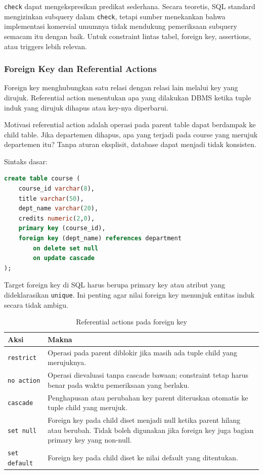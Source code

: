 \texttt{check} dapat mengekspresikan predikat sederhana. Secara teoretis, SQL standard mengizinkan subquery dalam \texttt{check}, tetapi sumber menekankan bahwa implementasi komersial umumnya tidak mendukung pemeriksaan subquery semacam itu dengan baik. Untuk constraint lintas tabel, foreign key, assertions, atau triggers lebih relevan.

\subsubsection{Foreign Key dan Referential Actions}

\begin{jawab}
Foreign key menghubungkan satu relasi dengan relasi lain melalui key yang dirujuk. Referential action menentukan apa yang dilakukan DBMS ketika tuple induk yang dirujuk dihapus atau key-nya diperbarui.
\end{jawab}

Motivasi referential action adalah operasi pada parent table dapat berdampak ke child table. Jika departemen dihapus, apa yang terjadi pada course yang merujuk departemen itu? Tanpa aturan eksplisit, database dapat menjadi tidak konsisten.

Sintaks dasar:
\begin{lstlisting}[language=SQL, caption={Contoh foreign key dengan referential action}, label={lst:foreign-key-action}]
create table course (
    course_id varchar(8),
    title varchar(50),
    dept_name varchar(20),
    credits numeric(2,0),
    primary key (course_id),
    foreign key (dept_name) references department
        on delete set null
        on update cascade
);
\end{lstlisting}

Target foreign key di SQL harus berupa primary key atau atribut yang dideklarasikan \texttt{unique}. Ini penting agar nilai foreign key menunjuk entitas induk secara tidak ambigu.

\begin{table}[H]
\centering
\begin{tabularx}{\textwidth}{|L{0.24\textwidth}|X|}
\hline
\textbf{Aksi} & \textbf{Makna} \\
\hline
\texttt{restrict} & Operasi pada parent diblokir jika masih ada tuple child yang merujuknya. \\
\hline
\texttt{no action} & Operasi dievaluasi tanpa cascade bawaan; constraint tetap harus benar pada waktu pemeriksaan yang berlaku. \\
\hline
\texttt{cascade} & Penghapusan atau perubahan key parent diteruskan otomatis ke tuple child yang merujuk. \\
\hline
\texttt{set null} & Foreign key pada child diset menjadi null ketika parent hilang atau berubah. Tidak boleh digunakan jika foreign key juga bagian primary key yang non-null. \\
\hline
\texttt{set default} & Foreign key pada child diset ke nilai default yang ditentukan. \\
\hline
\end{tabularx}
\caption{Referential actions pada foreign key}
\label{tab:referential-actions}
\end{table}

